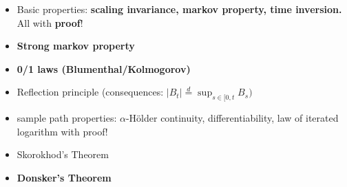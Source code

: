 \documentclass[11pt,a4paper, final]{article}
\theoremstyle{definition}
\begin{document}
\begin{enumerate}
\begin{itemize}
\item Basic properties: \textbf{scaling invariance, markov property, time inversion.} All with \textbf{proof}!
\item \textbf{Strong markov property}
\item \textbf{0/1 laws (Blumenthal/Kolmogorov)}
\item Reflection principle (consequences: $|B_t| \overset{d}= \sup_{s \in [0,t} B_s)$
\item sample path properties: $\alpha$-Hölder continuity, differentiability, law of iterated logarithm with proof!
\item Skorokhod's Theorem 
\item \textbf{Donsker's Theorem}
\end{itemize}
\end{enumerate}
\end{document}
